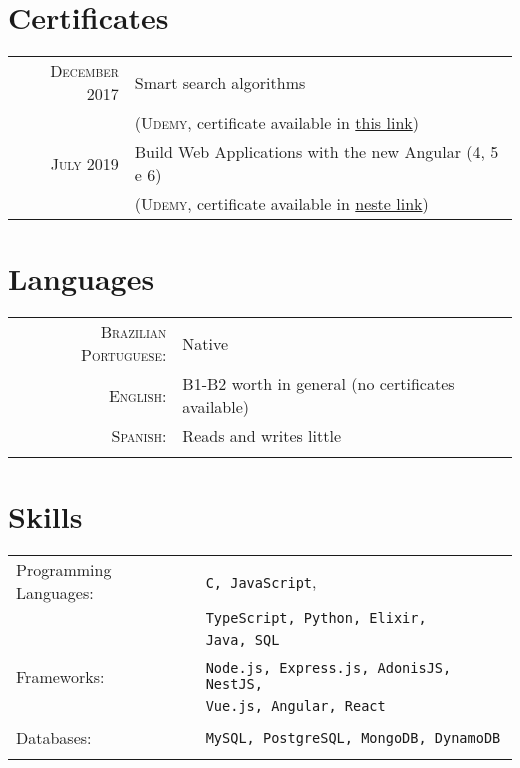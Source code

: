\documentclass[a4paper,10pt]{article}
\begin{document}
\section{Certificates}
\begin{tabular}{rl}
\textsc{December} 2017 & Smart search algorithms\\ & (\textsc{Udemy}, \footnotesize{certificate available in \href{https://www.udemy.com/certificate/UC-9414I0UR/}{this link}})\\
\textsc{July} 2019 &  Build Web Applications with the new Angular (4, 5 e 6)\\ & (\textsc{Udemy}, \footnotesize{certificate available in \href{https://www.udemy.com/certificate/UC-P6VGWTET/}{neste link}})
\end{tabular}

\section{Languages}
\begin{tabular}{rl}
 \textsc{Brazilian Portuguese:}& Native\\
\textsc{English:}&B1-B2 worth in general (no certificates available)\\
\textsc{Spanish:}&Reads and writes little\\\\
\end{tabular}

\section{Skills}
\begin{tabular}{ll}
  Programming Languages: &\texttt{C, JavaScript},\\
                         &\texttt{TypeScript, Python, Elixir,}\\
                         &\texttt{Java, SQL}\\\\
  Frameworks: &\texttt{Node.js, Express.js, AdonisJS, NestJS,}\\
              &\texttt{Vue.js, Angular, React}\\\\
  Databases: &\texttt{MySQL, PostgreSQL, MongoDB, DynamoDB}\\\\
\end{tabular}
\end{document}
